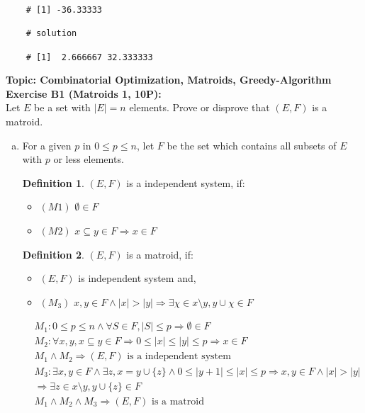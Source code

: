 \documentclass[12pt]{article}
\theoremstyle{definition}
\newtheorem{definition}{Definition}[section]
\begin{document}
\begin{flushleft}
\begin{lstlisting}
    # [1] -36.33333
    
    # solution
    
    # [1]  2.666667 32.333333    
\end{lstlisting}
\newpage
\textbf{Topic: Combinatorial Optimization, Matroids, Greedy-Algorithm} \\
\textbf{Exercise B1 (Matroids 1, 10P):} \\
Let $E$ be a set with $|E| = n$ elements. Prove or disprove that $(E, F)$ is a matroid.
\begin{enumerate}[(a)]
    \item For a given $p$ in $0 \leq p \leq n$, let $F$ be the set which contains all subsets of $E$ with $p$
    or less elements.
    \begin{definition}
        $(E,F)$ is a independent system, if:
        \begin{itemize}
            \item $(M1)$ $\emptyset \in F$
            \item $(M2)$ $x \subseteq y \in F \Longrightarrow x \in F$
        \end{itemize}
    \end{definition}
    \begin{definition}
        $(E,F)$ is a matroid, if:
        \begin{itemize}
            \item $(E,F)$ is independent system and,
            \item  $(M_3)$ $x, y \in F \land |x| > |y| \Longrightarrow \exists \chi \in x \setminus y, y \cup {\chi} \in F$
        \end{itemize}
    \end{definition}
    \begin{align*}
        &M_1 : 0 \leq p \leq n \land \forall S \in F, |S| \leq p \Longrightarrow \emptyset \in F \\
        &M_2 : \forall x,y, x \subseteq y \in F \Longrightarrow 0 \leq |x| \leq |y| \leq p \Longrightarrow x \in F \\ 
        &M_1 \land M_2 \Longrightarrow (E,F) \text{ is a independent system} \\
        &M_3 : \exists x, y \in F \land \exists z, x = y \cup \{z\} \land 0 \leq |y + 1| \leq |x| \leq p \Longrightarrow x, y \in F \land |x| > |y| \\
        &\Longrightarrow \exists z \in x \setminus y, y \cup \{z\} \in F \\
        &M_1 \land M_2 \land M_3 \Longrightarrow (E,F) \text{ is a matroid}

\end{align*}
\end{enumerate}
\end{flushleft}
\end{document}
